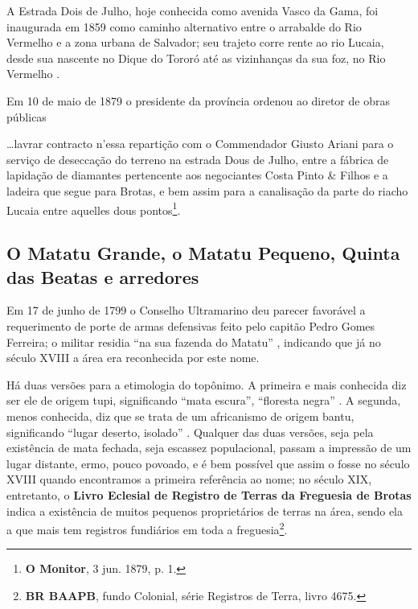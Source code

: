 A Estrada Dois de Julho, hoje conhecida como avenida Vasco da Gama, foi inaugurada em 1859 como caminho alternativo entre o arrabalde do Rio Vermelho e a zona urbana de Salvador; seu trajeto corre rente ao rio Lucaia, desde sua nascente no Dique do Tororó até as vizinhanças da sua foz, no Rio Vermelho \cite[p.~582]{ruy_politica_1949}.

Em 10 de maio de 1879 o presidente da província ordenou ao diretor de obras públicas 

\begin{citacao}
\dots lavrar contracto n'essa repartição com o Commendador Giusto Ariani para o serviço de deseccação do terreno na estrada Dous de Julho, entre a fábrica de lapidação de diamantes pertencente aos negociantes Costa Pinto \& Filhos e a ladeira que segue para Brotas, e bem assim para a canalisação da parte do riacho Lucaia entre aquelles dous pontos\footnote{\textbf{O Monitor}, 3 jun. 1879, p. 1.}.
\end{citacao}

\subsection{O Matatu Grande, o Matatu Pequeno, Quinta das Beatas e arredores}\label{subsec:matatubeatas}

Em 17 de junho de 1799 o Conselho Ultramarino deu parecer favorável a requerimento de porte de armas defensivas feito pelo capitão Pedro Gomes Ferreira; o militar residia ``na sua fazenda do Matatu'' \cite[p.~228]{castralmeida_ultramar_1914}, indicando que já no século XVIII a área era reconhecida por este nome. 

Há duas versões para a etimologia do topônimo. A primeira e mais conhecida diz ser ele de origem tupi, significando ``mata escura'', ``floresta negra'' \cite[p.~281]{sampaio_tupi_1987}. A segunda, menos conhecida, diz que se trata de um africanismo de origem bantu, significando ``lugar deserto, isolado'' \cite[p. 46]{dorea_ruas_2006}. Qualquer das duas versões, seja pela existência de mata fechada, seja escassez populacional, passam a impressão de um lugar distante, ermo, pouco povoado, e é bem possível que assim o fosse no século XVIII quando encontramos a primeira referência ao nome; no século XIX, entretanto, o \textbf{Livro Eclesial de Registro de Terras da Freguesia de Brotas} indica a existência de muitos pequenos proprietários de terras na área, sendo ela a que mais tem registros fundiários em toda a freguesia\footnote{\textbf{BR BAAPB}, fundo Colonial, série Registros de Terra, livro 4675.}.

